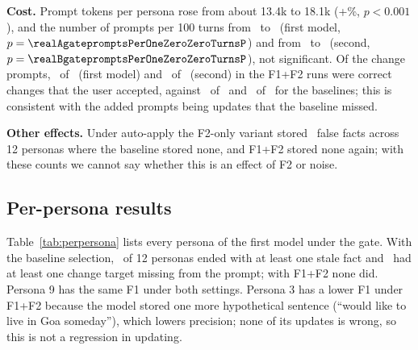\IfFileExists{IEEEtran.cls}{\documentclass[journal]{IEEEtran}\def\HAVEIEEE{1}}{\documentclass[10pt,twocolumn]{article}\usepackage[margin=0.7in,columnsep=0.25in]{geometry}}
\begin{document}
\textbf{Cost.} Prompt tokens per persona rose from about 13.4k to 18.1k (+\tokInc\%, $p<0.001$), and the number of prompts per 100 turns from \realAgatepromptsPerOneZeroZeroTurnsBase\ to \realAgatepromptsPerOneZeroZeroTurnsBoth\ (first model, $p=\realAgatepromptsPerOneZeroZeroTurnsP$) and from \realBgatepromptsPerOneZeroZeroTurnsBase\ to \realBgatepromptsPerOneZeroZeroTurnsBoth\ (second, $p=\realBgatepromptsPerOneZeroZeroTurnsP$), not significant. Of the change prompts, \gateAcceptedABoth\ of \gatePromptsABoth\ (first model) and \gateAcceptedBBoth\ of \gatePromptsBBoth\ (second) in the F1+F2 runs were correct changes that the user accepted, against \gateAcceptedABase\ of \gatePromptsABase\ and \gateAcceptedBBase\ of \gatePromptsBBase\ for the baselines; this is consistent with the added prompts being updates that the baseline missed.\label{sec:cost}

\textbf{Other effects.} Under auto-apply the F2-only variant stored \falseAutoTwoA\ false facts across 12 personas where the baseline stored none, and F1+F2 stored none again; with these counts we cannot say whether this is an effect of F2 or noise.

\subsection{Per-persona results}
Table~\ref{tab:perpersona} lists every persona of the first model under the gate. With the baseline selection, \personasStaleBase\ of 12 personas ended with at least one stale fact and \personasMissBase\ had at least one change target missing from the prompt; with F1+F2 none did. Persona 9 has the same F1 under both settings. Persona 3 has a lower F1 under F1+F2 because the model stored one more hypothetical sentence (``would like to live in Goa someday''), which lowers precision; none of its updates is wrong, so this is not a regression in updating.

\begin{table}[!t]
\centering\footnotesize
\caption{Per-persona results, first model, gate policy. Missed targets: change turns whose target memory was not in the prompt.}
\label{tab:perpersona}
\end{table}
\end{document}
